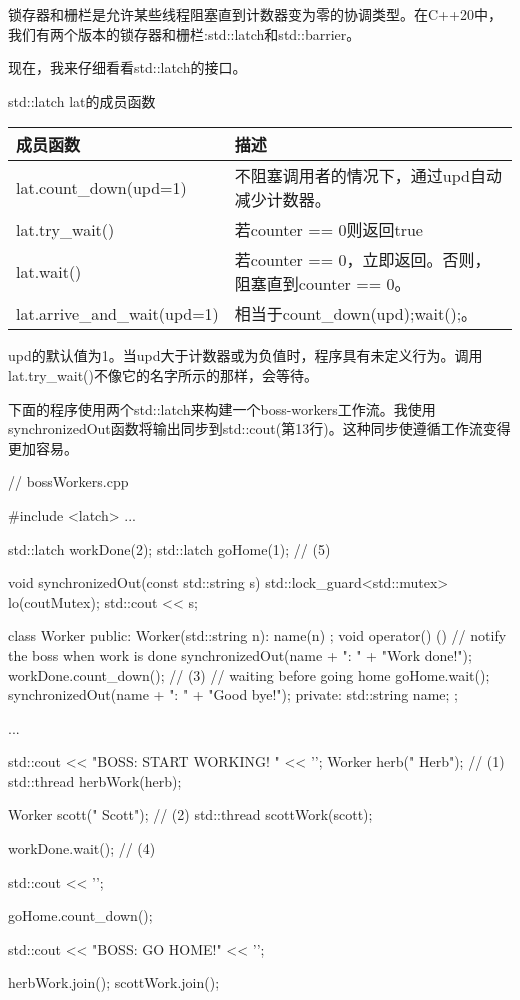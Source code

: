 锁存器和栅栏是允许某些线程阻塞直到计数器变为零的协调类型。在C++20中，我们有两个版本的锁存器和栅栏:std::latch和std::barrier。


现在，我来仔细看看std::latch的接口。

\begin{center}
std::latch lat的成员函数
\end{center}

\begin{longtable}[c]{|l|l|}
\hline
\textbf{成员函数} & \textbf{描述}         \\ \hline
\endfirsthead
%
\endhead
%
lat.count\_down(upd=1)       & 不阻塞调用者的情况下，通过upd自动减少计数器。  \\ \hline
lat.try\_wait()          & 若counter == 0则返回true \\ \hline
lat.wait()                   & 若counter == 0，立即返回。否则，阻塞直到counter == 0。 \\ \hline
lat.arrive\_and\_wait(upd=1) & 相当于count\_down(upd);wait();。                                \\ \hline
\end{longtable}


upd的默认值为1。当upd大于计数器或为负值时，程序具有未定义行为。调用lat.try\_wait()不像它的名字所示的那样，会等待。

下面的程序使用两个std::latch来构建一个boss-workers工作流。我使用synchronizedOut函数将输出同步到std::cout(第13行)。这种同步使遵循工作流变得更加容易。


\begin{cpp}
// bossWorkers.cpp

#include <latch>
...

std::latch workDone(2);
std::latch goHome(1); // (5)

void synchronizedOut(const std::string s) {
	std::lock_guard<std::mutex> lo(coutMutex);
	std::cout << s;
}

class Worker {
public:
	Worker(std::string n): name(n) { };
	void operator() (){
		// notify the boss when work is done
		synchronizedOut(name + ": " + "Work done!\n");
		workDone.count_down(); // (3)
		// waiting before going home
		goHome.wait();
		synchronizedOut(name + ": " + "Good bye!\n");
	}
private:
	std::string name;
};

...

std::cout << "BOSS: START WORKING! " << '\n';
Worker herb("   Herb"); // (1)
std::thread herbWork(herb);

Worker scott("    Scott"); // (2)
std::thread scottWork(scott);

workDone.wait(); // (4)

std::cout << '\n';

goHome.count_down();

std::cout << "BOSS: GO HOME!" << '\n';

herbWork.join();
scottWork.join();
\end{cpp}


